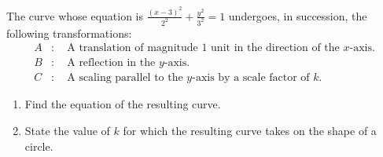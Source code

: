 \begin{problem}
    The curve whose equation is $\frac{(x-3)^2}{2^2} + \frac{y^2}{3^2} = 1$ undergoes, in succession, the following transformations:
    \begin{align*}
        A &: \quad \text{A translation of magnitude 1 unit in the direction of the $x$-axis.}\\
        B &: \quad \text{A reflection in the $y$-axis.}\\
        C &: \quad \text{A scaling parallel to the $y$-axis by a scale factor of $k$.}
    \end{align*}

    \begin{enumerate}
        \item Find the equation of the resulting curve.
        \item State the value of $k$ for which the resulting curve takes on the shape of a circle.
    \end{enumerate}
\end{problem}

